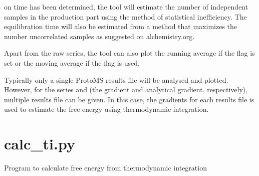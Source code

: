 \documentclass[letterpaper,10pt,english]{sphinxmanual}
\begin{document}
on time has been determined, the tool will estimate the number of independent samples in the production part using the method of statistical inefficiency. The equilibration time will also be estimated from a method that maximizes the number uncorrelated samples as suggested on alchemistry.org.

Apart from the raw series, the tool can also plot the running average if the  flag is set or the moving average if the  flag is used.

Typically only a single ProtoMS results file will be analysed and plotted. However, for the series  and  (the gradient and analytical gradient, respectively), multiple results file can be given. In this case, the gradients for each results file is used to estimate the free energy using thermodynamic integration.


\section{calc\_ti.py}
\label{\detokenize{tools:calc-ti-py}}

Program to calculate free energy from thermodynamic integration


%
\begin{sphinxVerbatim}[commandchars=\\\{\}]
  \PYG{p}{[}\PYG{p}{]} \PYG{p}{[} \PYG{p}{]} \PYG{p}{[} \PYG{p}{]} \PYG{p}{[} \PYG{p}{]} \PYG{p}{[} \PYG{p}{]}
                  \PYG{p}{[} \PYG{p}{]} \PYG{p}{[}\PYG{p}{]} \PYG{p}{[}\PYG{p}{]} \PYG{p}{[}\PYG{p}{]} \PYG{p}{[}\PYG{p}{]} \PYG{p}{[}\PYG{p}{]} \PYG{p}{[}\PYG{p}{]} \PYG{p}{[}\PYG{p}{]}
                  \PYG{p}{[} \PYG{p}{]} \PYG{p}{[}\PYG{p}{]}
\end{sphinxVerbatim}
\end{document}

